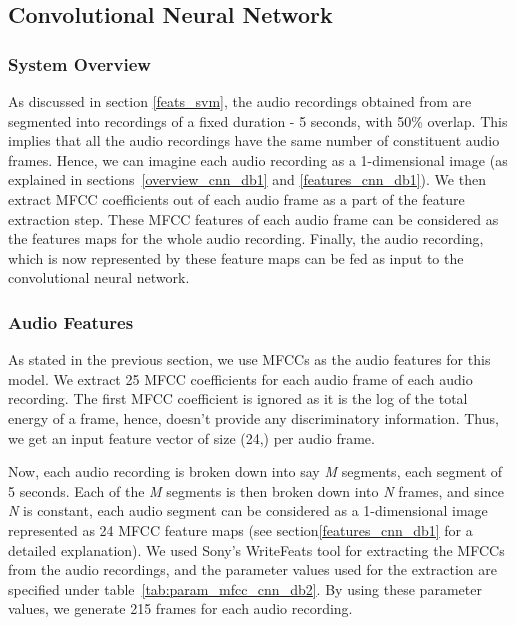 \subsection{Convolutional Neural Network}

\subsubsection{System Overview}
As discussed in section \ref{feats_svm}, the audio recordings obtained from \cite{kons2013audio} are segmented into recordings of a fixed duration - 5 seconds, with 50\% overlap. This implies that all the audio recordings have the same number of constituent audio frames. Hence, we can imagine each audio recording as a 1-dimensional image (as explained in sections~\ref{overview_cnn_db1} and \ref{features_cnn_db1}). We then extract MFCC coefficients out of each audio frame as a part of the feature extraction step. These MFCC features of each audio frame can be considered as the features maps for the whole audio recording. Finally, the audio recording, which is now represented by these feature maps can be fed as input to the convolutional neural network.

\subsubsection{Audio Features}
As stated in the previous section, we use MFCCs as the audio features for this model. We extract 25 MFCC coefficients for each audio frame of each audio recording. The first MFCC coefficient is ignored as it is the log of the total energy of a frame, hence, doesn't provide any discriminatory information. Thus, we get an input feature vector of size (24,) per audio frame.

Now, each audio recording is broken down into say \textsl{M} segments, each segment of 5 seconds. Each of the \textsl{M} segments is then broken down into \textsl{N} frames, and since \textsl{N} is constant, each audio segment can be considered as a 1-dimensional image represented as 24 MFCC feature maps (see section\ref{features_cnn_db1} for a detailed explanation). We used Sony's WriteFeats tool for extracting the MFCCs from the audio recordings, and the parameter values used for the extraction are specified under table~\ref{tab:param_mfcc_cnn_db2}. By using these parameter values, we generate 215 frames for each audio recording.

